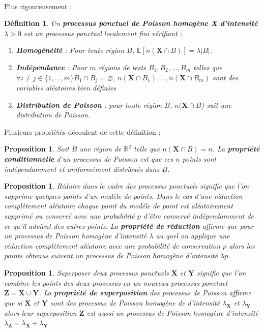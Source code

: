 \documentclass[12pt]{article}
\newcommand{\R}{\mathbb{R}}
\newtheorem{prop1}[thm1]{Proposition}
\newtheorem*{defin1}{Définition}
\begin{document}
\\
Plus rigoureusement :
\begin{defin1}
    Un \textbf{processus ponctuel de Poisson homogène X d'intensité $\lambda > 0$} est un processus ponctuel localement fini vérifiant :
    \begin{enumerate}
        \item \textbf{Homogénéité} : Pour toute région $B$,  $\mathbb{E}[n(\textbf{X}\cap B)] = \lambda|B|$.
        \item \textbf{Indépendance} : Pour $m$ régions de tests $B_1,B_2,\dots,B_m$ telles que $\forall i \neq j \in \{1,\dots,m\} B_1 \cap B_j = \varnothing $, $n(\textbf{X}\cap B_1),\dots,n(\textbf{X}\cap B_m)$ sont des variables aléatoires bien définies
        \item \textbf{Distribution de Poisson} : pour toute région $B$, $n(\textbf{X}\cap B$) suit une distribution de Poisson.
    \end{enumerate}
\end{defin1}
Plusieurs propriétés découlent de cette définition :
\begin{prop1}
Soit $B$ une région de $\R^2$ telle que $n(\textbf{X} \cap B) =n$. La \textbf{propriété conditionnelle} d'un processus de Poisson est que ces $n$ points sont indépendamment et uniformément distribués dans $B$.
\end{prop1}

\begin{prop1}
Réduire dans le cadre des processus ponctuels signifie que l'on supprime quelques points d'un modèle de points. Dans le cas d'une \textit{réduction complètement aléatoire} chaque point du modèle de point est aléatoirement supprimé ou conservé avec une probabilité $p$ d'être conservé indépendamment de ce qu'il advient des autres points. La \textbf{propriété de réduction} affirme que pour un processus de Poisson homogène d'intensité $\lambda$ au quel on applique une réduction complètement aléatoire avec une probabilité de conservation $p$ alors les points obtenus suivent un processus de Poisson homogène d'intensité $\lambda p$.
\end{prop1}

\begin{prop1}
Superposer deux processus ponctuels $\textbf{X}$ et $\textbf{Y}$ signifie que l'on combine les points des deux processus en un nouveau processus ponctuel $\textbf{Z} = \textbf{X}  \cup \textbf{Y}$. La \textbf{propriété de superposition} des processus de Poisson affirme que si $\textbf{X}$ et $\textbf{Y}$ sont des processus de Poisson homogène de d'intensité $\lambda_{\textbf{X}}$ et $\lambda_{\textbf{Y}}$ alors leur superposition $\textbf{Z}$ est aussi un processus de Poisson homogène d’intensité $\lambda_{\textbf{Z}} = \lambda_{\textbf{X}} + \lambda_{\textbf{Y}}$
\end{prop1}
\end{document}
